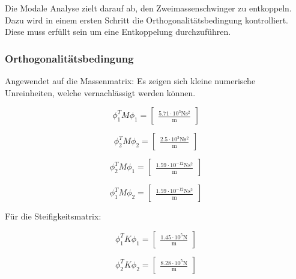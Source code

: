 \documentclass[
  letterpaper,
  DIV=11]{scrreprt}
\begin{document}
Die Modale Analyse zielt darauf ab, den Zweimassenschwinger zu
entkoppeln. Dazu wird in einem ersten Schritt die
Orthogonalitätsbedingung kontrolliert. Diese muss erfüllt sein um eine
Entkoppelung durchzuführen.

\hypertarget{orthogonalituxe4tsbedingung-3}{%
\subsubsection{Orthogonalitätsbedingung}\label{orthogonalituxe4tsbedingung-3}}

Angewendet auf die Massenmatrix: Es zeigen sich kleine numerische
Unreinheiten, welche vernachlässigt werden können.

\begin{equation}\phi_{1}^{T} M \phi_{1} = \left[\begin{matrix}\frac{5.71 \cdot 10^{3} \text{N} \text{s}^{2}}{\text{m}}\end{matrix}\right]\end{equation}

\begin{equation}\phi_{2}^{T} M \phi_{2} = \left[\begin{matrix}\frac{2.5 \cdot 10^{3} \text{N} \text{s}^{2}}{\text{m}}\end{matrix}\right]\end{equation}

\begin{equation}\phi_{2}^{T} M \phi_{1} = \left[\begin{matrix}\frac{1.59 \cdot 10^{-12} \text{N} \text{s}^{2}}{\text{m}}\end{matrix}\right]\end{equation}

\begin{equation}\phi_{1}^{T} M \phi_{2} = \left[\begin{matrix}\frac{1.59 \cdot 10^{-12} \text{N} \text{s}^{2}}{\text{m}}\end{matrix}\right]\end{equation}

Für die Steifigkeitsmatrix:

\begin{equation}\phi_{1}^{T} K \phi_{1} = \left[\begin{matrix}\frac{1.45 \cdot 10^{5} \text{N}}{\text{m}}\end{matrix}\right]\end{equation}

\begin{equation}\phi_{2}^{T} K \phi_{2} = \left[\begin{matrix}\frac{8.28 \cdot 10^{5} \text{N}}{\text{m}}\end{matrix}\right]\end{equation}
\end{document}
